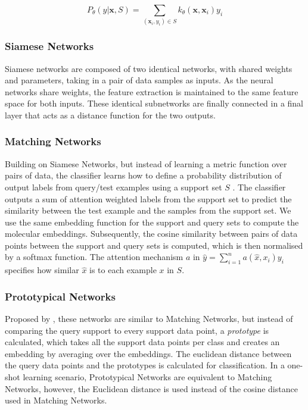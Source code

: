 \documentclass[journal=acscii,manuscript=article]{achemso}
\begin{document}
\begin{equation}
\label{kernel}
P_\theta(y \vert \mathbf{x}, S) = \sum_{(\mathbf{x}_i, y_i) \in S} k_\theta(\mathbf{x}, \mathbf{x}_i)y_i
\end{equation}

\subsubsection{Siamese Networks}

Siamese networks \cite{bromley1993signature, koch2015siamese} are composed of two identical networks, with shared weights and parameters, taking in a pair of data samples as inputs. As the neural networks share weights, the feature extraction is maintained to the same feature space for both inputs. These identical subnetworks are finally connected in a final layer that acts as a distance function for the two outputs.

\subsubsection{Matching Networks}

Building on Siamese Networks, but instead of learning a metric function over pairs of data, the classifier learns how to define a probability distribution of output labels from query/test examples using a support set $S$ \cite{vinyals2016matching}. The classifier outputs a sum of attention weighted labels from the support set to predict the similarity between the test example and the samples from the support set. We use the same embedding function for the support and query sets to compute the molecular embeddings. Subsequently, the cosine similarity between pairs of data points between the support and query sets is computed, which is then normalised by a softmax function. The attention mechanism $a$ in $\hat{y} = \sum_{i=1}^{n} a(\hat{x}, x_i)y_i$ specifies how similar $\hat{x}$ is to each example $x$ in $S$.

\subsubsection{Prototypical Networks}

Proposed by \citet{snell2017prototypical}, these networks are similar to Matching Networks, but instead of comparing the query support to every support data point, a \textit{prototype} is calculated, which takes all the support data points per class and creates an embedding by averaging over the embeddings. The euclidean distance between the query data points and the prototypes is calculated for classification. In a one-shot learning scenario, Prototypical Networks are equivalent to Matching Networks, however, the Euclidean distance is used instead of the cosine distance used in Matching Networks.
\end{document}
